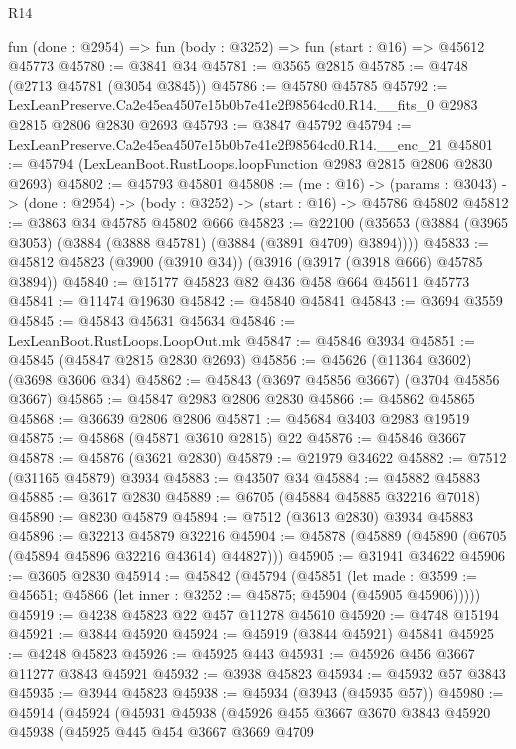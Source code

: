 \begin{lexlean}{R14}
\begin{coremodule}
  fun (done : @2954) => fun (body : @3252) => fun (start : @16) => @45612 @45773
@45780 := @3841 @34
@45781 := @3565 @2815
@45785 := @4748 (@2713 @45781 (@3054 @3845))
@45786 := @45780 @45785
@45792 := LexLeanPreserve.Ca2e45ea4507e15b0b7e41e2f98564cd0.R14.__fits_0
    @2983
    @2815
    @2806
    @2830
    @2693
@45793 := @3847 @45792
@45794 := LexLeanPreserve.Ca2e45ea4507e15b0b7e41e2f98564cd0.R14.__enc_21
@45801 := @45794 (LexLeanBoot.RustLoops.loopFunction @2983 @2815 @2806 @2830 @2693)
@45802 := @45793 @45801
@45808 := (me : @16) ->
  (params : @3043) -> (done : @2954) -> (body : @3252) -> (start : @16) -> @45786 @45802
@45812 := @3863 @34 @45785 @45802 @666
@45823 := @22100 (@35653 (@3884 (@3965 @3053) (@3884 (@3888 @45781) (@3884 (@3891 @4709) @3894))))
@45833 := @45812 @45823 (@3900 (@3910 @34)) (@3916 (@3917 (@3918 @666) @45785 @3894))
@45840 := @15177 @45823 @82 @436 @458 @664 @45611 @45773
@45841 := @11474 @19630
@45842 := @45840 @45841
@45843 := @3694 @3559
@45845 := @45843 @45631 @45634
@45846 := LexLeanBoot.RustLoops.LoopOut.mk
@45847 := @45846 @3934
@45851 := @45845 (@45847 @2815 @2830 @2693)
@45856 := @45626 (@11364 @3602) (@3698 @3606 @34)
@45862 := @45843 (@3697 @45856 @3667) (@3704 @45856 @3667)
@45865 := @45847 @2983 @2806 @2830
@45866 := @45862 @45865
@45868 := @36639 @2806 @2806
@45871 := @45684 @3403 @2983 @19519
@45875 := @45868 (@45871 @3610 @2815) @22
@45876 := @45846 @3667
@45878 := @45876 (@3621 @2830)
@45879 := @21979 @34622
@45882 := @7512 (@31165 @45879) @3934
@45883 := @43507 @34
@45884 := @45882 @45883
@45885 := @3617 @2830
@45889 := @6705 (@45884 @45885 @32216 @7018)
@45890 := @8230 @45879
@45894 := @7512 (@3613 @2830) @3934 @45883
@45896 := @32213 @45879 @32216
@45904 := @45878 (@45889 (@45890 (@6705 (@45894 @45896 @32216 @43614) @44827)))
@45905 := @31941 @34622
@45906 := @3605 @2830
@45914 := @45842
    (@45794
      (@45851
        (let made : @3599 := @45651; @45866 (let inner : @3252 := @45875; @45904 (@45905 @45906)))))
@45919 := @4238 @45823 @22 @457 @11278 @45610
@45920 := @4748 @15194
@45921 := @3844 @45920
@45924 := @45919 (@3844 @45921) @45841
@45925 := @4248 @45823
@45926 := @45925 @443
@45931 := @45926 @456 @3667 @11277 @3843 @45921
@45932 := @3938 @45823
@45934 := @45932 @57 @3843
@45935 := @3944 @45823
@45938 := @45934 (@3943 (@45935 @57))
@45980 := @45914
    (@45924
      (@45931
        @45938
        (@45926
          @455
          @3667
          @3670
          @3843
          @45920
          @45938
          (@45925
            @445
            @454
            @3667
            @3669
            @4709

\end{coremodule}
\end{lexlean}
